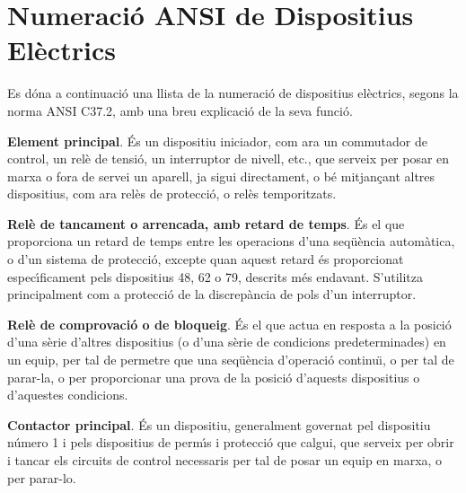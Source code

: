 \chapter{Numeraci\'{o} \textsf{ANSI} de Dispositius El\`{e}ctrics} 

Es d\'{o}na a continuaci\'{o} una llista de la numeraci\'{o} de dispositius
el\`{e}ctrics, segons la norma \textsf{ANSI C37.2}, amb una breu
explicaci\'{o} de la seva funci\'{o}.

\begin{multicols}{2}
\begin{list}{}
{\setlength{\labelwidth}{6mm} \setlength{\leftmargin}{6mm}
\setlength{\labelsep}{2mm}}

\item[\textbf{1}]  \textbf{Element principal}. \'{E}s un dispositiu
iniciador, com ara un commutador de control, un rel\`{e} de tensi\'{o}, un
interruptor de nivell, etc., que serveix per posar en marxa o fora
de servei un aparell, ja sigui directament, o b\'{e}  mitjan\c{c}ant altres
dispositius, com ara rel\`{e}s de protecci\'{o}, o rel\`{e}s temporitzats.

\item[\textbf{2}]  \textbf{Rel\`{e}
de tancament o arrencada, amb retard de temps}. \'{E}s el que
proporciona un retard de temps entre les operacions d'una seq\"{u}\`{e}ncia
autom\`{a}tica, o d'un sistema de protecci\'{o}, excepte quan aquest retard
\'{e}s proporcionat espec\'{\i}ficament pels dispositius 48, 62 o 79,
descrits m\'{e}s endavant. S'utilitza principalment com a protecci\'{o} de
la discrep\`{a}ncia de pols d'un interruptor.

\item[\textbf{3}]  \textbf{Rel\`{e} de comprovaci\'{o} o
de bloqueig}. \'{E}s el que actua en resposta a la posici\'{o} d'una s\`{e}rie
d'altres dispositius (o d'una s\`{e}rie de condicions predeterminades)
en un equip, per tal de permetre que una seq\"{u}\`{e}ncia d'operaci\'{o}
continu\"{\i}, o per tal de parar-la, o per proporcionar una prova de la
posici\'{o} d'aquests dispositius o d'aquestes condicions.

\item[\textbf{4}]  \textbf{Contactor principal}. \'{E}s un dispositiu,
generalment governat pel dispositiu n\'{u}mero 1 i pels dispositius de perm\'{\i}s i protecci\'{o}
que calgui, que serveix per obrir i tancar els circuits de control necessaris per tal de
posar un equip en marxa, o per parar-lo.


\end{list}
\end{multicols}
